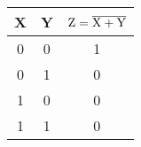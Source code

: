 \begin{figure}[h]
  \def\@captype{table}
  \begin{minipage}[t]{.48\textwidth}
    \begin{center}
      \begin{tabular}{ccc}
        \hline
        X & Y & $\rm Z=\overline{X+Y}$\\
        \hline
        0 & 0 & 1\\
        0 & 1 & 0\\
        1 & 0 & 0\\
        1 & 1 & 0\\
        \hline
      \end{tabular}
    \end{center}
    \label{tab:norgate}
  \end{minipage}
  \hfill
  \begin{minipage}[c]{.48\textwidth}
  \end{minipage}
\end{figure}
\clearpage
